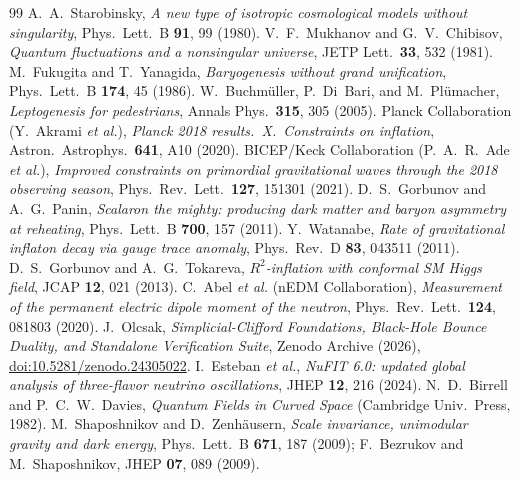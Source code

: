 \documentclass[11pt,a4paper]{article}
\begin{document}
\begingroup\small
\begin{thebibliography}{99}
 A.~A.~Starobinsky, \textit{A new type of isotropic cosmological models without singularity}, Phys.\ Lett.\ B \textbf{91}, 99 (1980).
 V.~F.~Mukhanov and G.~V.~Chibisov, \textit{Quantum fluctuations and a nonsingular universe}, JETP Lett.\ \textbf{33}, 532 (1981).
 M.~Fukugita and T.~Yanagida, \textit{Baryogenesis without grand unification}, Phys.\ Lett.\ B \textbf{174}, 45 (1986).
 W.~Buchm\"uller, P.~Di~Bari, and M.~Pl\"umacher, \textit{Leptogenesis for pedestrians}, Annals Phys.\ \textbf{315}, 305 (2005).
 Planck Collaboration (Y.~Akrami \textit{et al.}), \textit{Planck 2018 results.\ X.\ Constraints on inflation}, Astron.\ Astrophys.\ \textbf{641}, A10 (2020).
 BICEP/Keck Collaboration (P.~A.~R.~Ade \textit{et al.}), \textit{Improved constraints on primordial gravitational waves through the 2018 observing season}, Phys.\ Rev.\ Lett.\ \textbf{127}, 151301 (2021).
 D.~S.~Gorbunov and A.~G.~Panin, \textit{Scalaron the mighty: producing dark matter and baryon asymmetry at reheating}, Phys.\ Lett.\ B \textbf{700}, 157 (2011).
 Y.~Watanabe, \textit{Rate of gravitational inflaton decay via gauge trace anomaly}, Phys.\ Rev.\ D \textbf{83}, 043511 (2011).
 D.~S.~Gorbunov and A.~G.~Tokareva, \textit{$R^2$-inflation with conformal SM Higgs field}, JCAP \textbf{12}, 021 (2013).
 C.~Abel \textit{et al.} (nEDM Collaboration), \textit{Measurement of the permanent electric dipole moment of the neutron}, Phys.\ Rev.\ Lett.\ \textbf{124}, 081803 (2020).
 J.~Olcsak, \textit{Simplicial-Clifford Foundations, Black-Hole Bounce Duality, and Standalone Verification Suite}, Zenodo Archive (2026), \href{https://doi.org/10.5281/zenodo.24305022}{doi:10.5281/zenodo.24305022}.
 I.~Esteban \textit{et al.}, \textit{NuFIT 6.0: updated global analysis of three-flavor neutrino oscillations}, JHEP \textbf{12}, 216 (2024).
 N.~D.~Birrell and P.~C.~W.~Davies, \textit{Quantum Fields in Curved Space} (Cambridge Univ.\ Press, 1982).
 M.~Shaposhnikov and D.~Zenh\"ausern, \textit{Scale invariance, unimodular gravity and dark energy}, Phys.\ Lett.\ B \textbf{671}, 187 (2009); F.~Bezrukov and M.~Shaposhnikov, JHEP \textbf{07}, 089 (2009).

\end{thebibliography}
\end{document}
